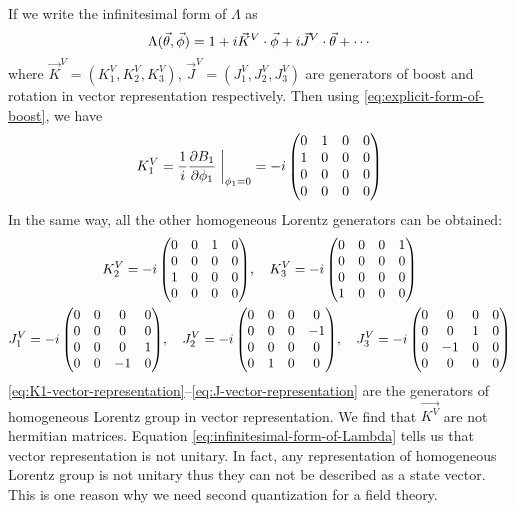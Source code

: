 If we write the infinitesimal form of $\Lambda$ as
\begin{equation} \label{eq:infinitesimal-form-of-Lambda}
  \Lambda(\vec{\theta},\vec{\phi}) = 1+i\vec{K}^V\cdot\vec{\phi}+i\vec{J}^V\cdot\vec{\theta}+\cdots
\end{equation}
where $\vec{K}^V=(K_1^V,K_2^V,K_3^V)$, $\vec{J}^V = (J_1^V,J_2^V,J_3^V)$ are generators of boost and rotation in vector representation respectively. Then using \eqref{eq:explicit-form-of-boost}, we have
\begin{equation} \label{eq:K1-vector-representation}
  K_1^V = \frac{1}{i}\pdv{B_1}{\f_1}\eval{}_{\f_1=0}
        = -i \, \mqty(0 & 1 & 0 & 0 \\
                      1 & 0 & 0 & 0 \\
                      0 & 0 & 0 & 0 \\
                      0 & 0 & 0 & 0)
\end{equation}
In the same way, all the other homogeneous Lorentz generators can be obtained:
\begin{gather} 
  K_2^V = -i \, \mqty(0 & 0 & 1 & 0   \\
                      0 & 0 & 0 & 0   \\
                      1 & 0 & 0 & 0   \\
                      0 & 0 & 0 & 0)  \qc
  K_3^V = -i \, \mqty(0 & 0 & 0 & 1   \\
                      0 & 0 & 0 & 0   \\
                      0 & 0 & 0 & 0   \\
                      1 & 0 & 0 & 0)  \label{eq:K2-K3-vector-representation} \\
  J_1^V = -i \, \mqty(0 & 0 &  0 & 0  \\
                      0 & 0 &  0 & 0  \\
                      0 & 0 &  0 & 1  \\
                      0 & 0 & -1 & 0) \qc
  J_2^V = -i \, \mqty(0 & 0 & 0 &  0  \\
                      0 & 0 & 0 & -1  \\
                      0 & 0 & 0 &  0  \\
                      0 & 1 & 0 &  0) \qc
  J_3^V = -i \, \mqty(0 &  0 & 0 & 0  \\
                      0 &  0 & 1 & 0  \\
                      0 & -1 & 0 & 0  \\
                      0 &  0 & 0 & 0) \label{eq:J-vector-representation}
\end{gather}
\eqref{eq:K1-vector-representation}--\eqref{eq:J-vector-representation} are the generators of homogeneous Lorentz group in vector representation. We find that $\vec{K^V}$ are not hermitian matrices. Equation \eqref{eq:infinitesimal-form-of-Lambda} tells us that vector representation is not unitary. In fact, any representation of homogeneous Lorentz group is not unitary thus they can not be described as a state vector. This is one reason why we need second quantization for a field theory.

